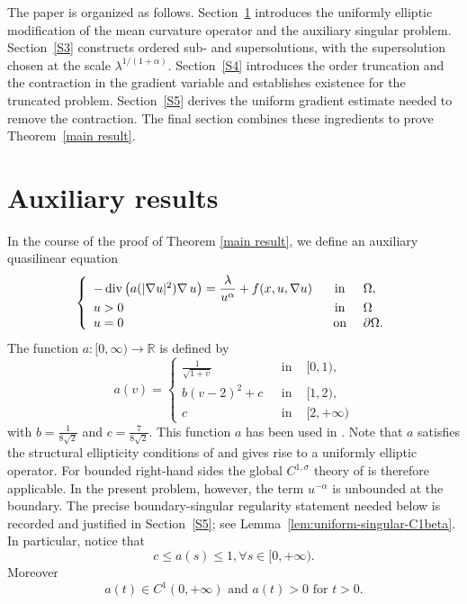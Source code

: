 \documentclass[11pt,leqno]{amsart}
\begin{document}
The paper is organized as follows. Section~\ref{auxiliary} introduces
the uniformly elliptic modification of the mean curvature operator and
the auxiliary singular problem. Section~\ref{S3} constructs ordered
sub- and supersolutions, with the supersolution chosen at the scale
$\lambda^{1/(1+\alpha)}$. Section~\ref{S4} introduces the order
truncation and the contraction in the gradient variable and establishes
existence for the truncated problem. Section~\ref{S5} derives the
uniform gradient estimate needed to remove the contraction. The final
section combines these ingredients to prove Theorem~\ref{main result}.

\section{Auxiliary results}\label{auxiliary}

In the course of the proof of Theorem \ref{main result}, we define an auxiliary quasilinear equation 
\begin{equation}\label{eq6}
	\left\{
	\begin{array}{lcl}
		-\operatorname{div}\left(a(|\nabla u|^2)\nabla\,u\right)  = \displaystyle\frac{\lambda}{u^{\alpha	}}  +f(x,u,\nabla u)\,\, &\mbox{ in }&\Omega, \\
		u>0 &\textup{ in }& \Omega\\
		u  = 0\,\, &\mbox{ on }& \partial \Omega.
	\end{array}
	\right.
\end{equation}
The function $a: [0,\infty)\rightarrow \mathbb{R}$ is defined by
\begin{equation}\label{eq7}
	a(v) = \left\{
	\begin{array}{rcl}
		\frac{1}{\sqrt{1+v}} & \, \, \mbox{ in } & [0,1), \\
		b(v-2)^2+c & \, \, \mbox{ in } & [1,2), \\
		c & \, \, \mbox{ in } & [2,+\infty)
	\end{array}
	\right.
\end{equation}
with $b=\frac{1}{8\sqrt{2}}$ and $c=\frac{7}{8\sqrt{2}}$. This function $a$ has been used in \cite{HabetsO}. Note that $a$ satisfies the structural ellipticity conditions of \cite{Lie} and gives rise to a uniformly elliptic operator. For bounded right-hand sides the global $C^{1,\sigma}$ theory of \cite{Lie} is therefore applicable. In the present problem, however, the term $u^{-\alpha}$ is unbounded at the boundary. The precise boundary-singular regularity statement needed below is recorded and justified in Section~\ref{S5}; see Lemma~\ref{lem:uniform-singular-C1beta}. In particular, notice that
\begin{equation}\label{ac}
	c \leq a(s) \leq 1, \forall s \in [0,+\infty). 
\end{equation}
Moreover
\begin{equation}\label{a0}
a(t) \in C^{1}(0,+\infty) \text { and } a(t)>0 \text { for } t>0.
\end{equation}
\end{document}
